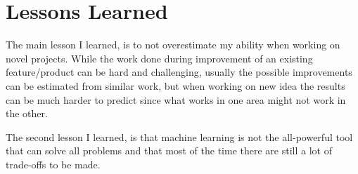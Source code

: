 \documentclass[12pt,a4paper]{book}
\begin{document}
\section{Lessons Learned}
The main lesson I learned, is to not overestimate my ability when working on novel projects.
While the work done during improvement of an existing feature/product can be hard and challenging, usually the possible improvements can be estimated from similar work, but when working on new idea the results can be much harder to predict since what works in one area might not work in the other.

The second lesson I learned, is that machine learning is not the all-powerful tool that can solve all problems and that most of the time there are still a lot of trade-offs to be made.

\printbibliography[heading=bibintoc,title={Bibliography}]

\appendix
\end{document}
